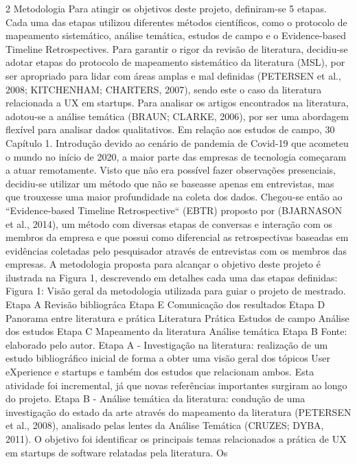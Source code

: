 2 Metodologia
Para atingir os objetivos deste projeto, definiram-se 5 etapas. Cada uma das etapas
utilizou diferentes métodos científicos, como o protocolo de mapeamento sistemático, análise
temática, estudos de campo e o Evidence-based Timeline Retrospectives. Para garantir
o rigor da revisão de literatura, decidiu-se adotar etapas do protocolo de mapeamento
sistemático da literatura (MSL), por ser apropriado para lidar com áreas amplas e mal
definidas (PETERSEN et al., 2008; KITCHENHAM; CHARTERS, 2007), sendo este o
caso da literatura relacionada a UX em startups. Para analisar os artigos encontrados
na literatura, adotou-se a análise temática (BRAUN; CLARKE, 2006), por ser uma
abordagem flexível para analisar dados qualitativos. Em relação aos estudos de campo,
30 Capítulo 1. Introdução
devido ao cenário de pandemia de Covid-19 que acometeu o mundo no início de 2020,
a maior parte das empresas de tecnologia começaram a atuar remotamente. Visto que
não era possível fazer observações presenciais, decidiu-se utilizar um método que não se
baseasse apenas em entrevistas, mas que trouxesse uma maior profundidade na coleta dos
dados. Chegou-se então ao “Evidence-based Timeline Retrospective“ (EBTR) proposto por
(BJARNASON et al., 2014), um método com diversas etapas de conversas e interação
com os membros da empresa e que possui como diferencial as retrospectivas baseadas em
evidências coletadas pelo pesquisador através de entrevistas com os membros das empresas.
A metodologia proposta para alcançar o objetivo deste projeto é ilustrada na Figura
1, descrevendo em detalhes cada uma das etapas definidas:
Figura 1: Visão geral da metodologia utilizada para guiar o projeto de mestrado.
Etapa A
Revisão bibliográca
Etapa E
Comunicação dos
resultados
Etapa D
Panorama entre
literatura e prática
Literatura Prática
Estudos de campo
Análise dos estudos
Etapa C
Mapeamento da
literatura
Análise temática
Etapa B
Fonte: elaborado pelo autor.
Etapa A - Investigação na literatura: realização de um estudo bibliográfico inicial
de forma a obter uma visão geral dos tópicos User eXperience e startups e também dos
estudos que relacionam ambos. Esta atividade foi incremental, já que novas referências
importantes surgiram ao longo do projeto.
Etapa B - Análise temática da literatura: condução de uma investigação do estado
da arte através do mapeamento da literatura (PETERSEN et al., 2008), analisado pelas
lentes da Análise Temática (CRUZES; DYBA, 2011). O objetivo foi identificar os principais
temas relacionados a prática de UX em startups de software relatadas pela literatura. Os
